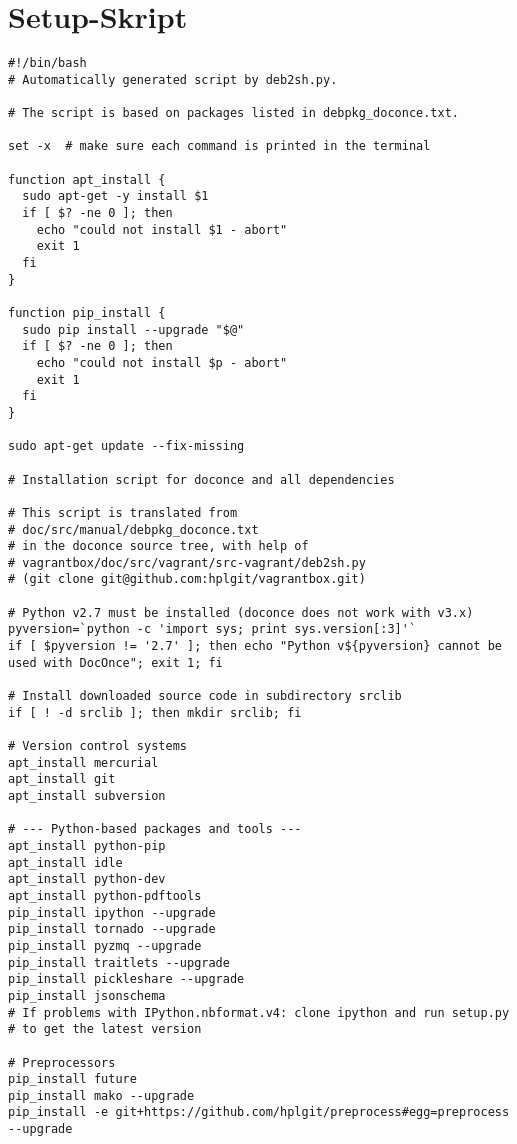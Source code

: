 \documentclass[%
oneside,                 %
final,                   %
chapterprefix=true,      %
open=right,              %
10pt]{book}
\begin{document}
\section{Setup-Skript}
\begin{verbatim}
#!/bin/bash
# Automatically generated script by deb2sh.py.

# The script is based on packages listed in debpkg_doconce.txt.

set -x  # make sure each command is printed in the terminal

function apt_install {
  sudo apt-get -y install $1
  if [ $? -ne 0 ]; then
    echo "could not install $1 - abort"
    exit 1
  fi
}

function pip_install {
  sudo pip install --upgrade "$@"
  if [ $? -ne 0 ]; then
    echo "could not install $p - abort"
    exit 1
  fi
}

sudo apt-get update --fix-missing

# Installation script for doconce and all dependencies

# This script is translated from
# doc/src/manual/debpkg_doconce.txt
# in the doconce source tree, with help of
# vagrantbox/doc/src/vagrant/src-vagrant/deb2sh.py
# (git clone git@github.com:hplgit/vagrantbox.git)

# Python v2.7 must be installed (doconce does not work with v3.x)
pyversion=`python -c 'import sys; print sys.version[:3]'`
if [ $pyversion != '2.7' ]; then echo "Python v${pyversion} cannot be used with DocOnce"; exit 1; fi

# Install downloaded source code in subdirectory srclib
if [ ! -d srclib ]; then mkdir srclib; fi

# Version control systems
apt_install mercurial
apt_install git
apt_install subversion

# --- Python-based packages and tools ---
apt_install python-pip
apt_install idle
apt_install python-dev
apt_install python-pdftools
pip_install ipython --upgrade
pip_install tornado --upgrade
pip_install pyzmq --upgrade
pip_install traitlets --upgrade
pip_install pickleshare --upgrade
pip_install jsonschema
# If problems with IPython.nbformat.v4: clone ipython and run setup.py
# to get the latest version

# Preprocessors
pip_install future
pip_install mako --upgrade
pip_install -e git+https://github.com/hplgit/preprocess#egg=preprocess --upgrade


\end{verbatim}
\end{document}
